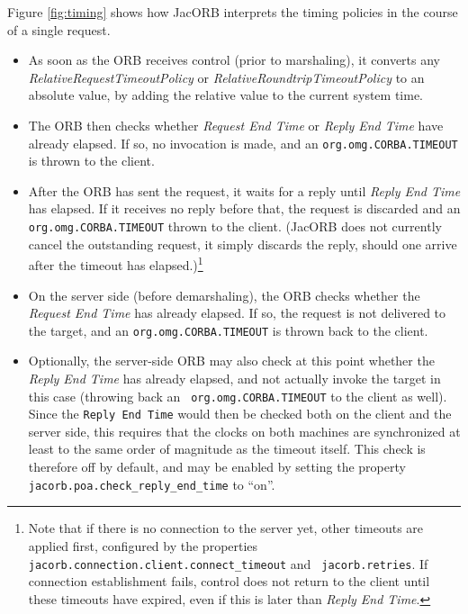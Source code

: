Figure \ref{fig:timing} shows how JacORB interprets the timing
policies in the course of a single request.

\begin{itemize}
\item As soon as the ORB receives control (prior to marshaling), it
converts any \emph{RelativeRequestTimeoutPolicy} or
\emph{RelativeRoundtripTimeoutPolicy} to an absolute value, by adding
the relative value to the current system time.

\item The ORB then checks whether \emph{Request End Time} or
\emph{Reply End Time} have already elapsed.  If so, no invocation is
made, and an {\tt org.omg.CORBA.TIMEOUT} is thrown to the client.

\item After the ORB has sent the request, it waits for a reply until
\emph{Reply End Time} has elapsed.  If it receives no reply before
that, the request is discarded and an {\tt org.omg.CORBA.TIMEOUT}
thrown to the client.  (JacORB does not currently cancel the
outstanding request, it simply discards the reply, should one arrive
after the timeout has elapsed.)\footnote{Note that if there is no
  connection to the server yet, other timeouts are applied first,
configured by the properties {\tt
  jacorb.connection.client.connect\_timeout} and {\tt
  jacorb.retries}.  If connection establishment fails, control does
not return to the client until these timeouts have expired, even if
this is later than \emph{Reply End Time}.}

\item On the server side (before demarshaling), the ORB checks whether
the \emph{Request End Time} has already elapsed.  If so, the request
is not delivered to the target, and an {\tt org.omg.CORBA.TIMEOUT}
is thrown back to the client.

\item Optionally, the server-side ORB may also check at this point
whether the \emph{Reply End Time} has already elapsed, and not
actually invoke the target in this case (throwing back an {\tt
org.omg.CORBA.TIMEOUT} to the client as well).  Since the {\tt Reply
  End Time} would then be checked both on the client and the server
side, this requires that the clocks on both machines are synchronized
at least to the same order of magnitude as the timeout itself.  This
check is therefore off by default, and may be enabled by setting the
property {\tt jacorb.poa.check\_reply\_end\_time} to ``on''.


\end{itemize}
